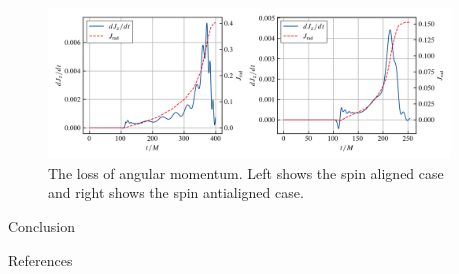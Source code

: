 \documentclass[noamssymb]{beamer}
\newlength{\sepwidth}
\newlength{\colwidth}
\newcommand{\separatorcolumn}{\begin{column}{\sepwidth}\end{column}}
\begin{document}
\begin{frame}[t]
\begin{columns}[t]
\begin{column}{\colwidth}
\begin{block}{}
	\begin{figure}
		\centering
		\includegraphics[width=\columnwidth]{img/jrad}
		\caption{The loss of angular momentum. Left shows the spin aligned case and right shows the spin antialigned case.}
	\end{figure}
	


  \end{block}

  \begin{block}{Conclusion}
	
    

  \end{block}

  \begin{block}{References}

    \footnotesize{}

  \end{block}

\end{column}

\separatorcolumn
\end{columns}
\end{frame}
\end{document}

